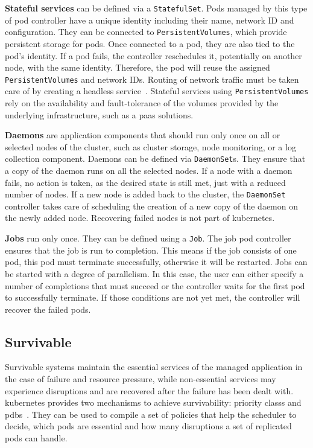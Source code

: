  \textbf{Stateful services} can be defined via a \texttt{StatefulSet}.
  Pods managed by this type of \gls{pod controller} have a unique identity including their name, network ID and configuration.
  They can be connected to \texttt{PersistentVolumes}, which provide persistent storage for pods.
  Once connected to a pod, they are also tied to the pod's identity.
  If a pod fails, the controller reschedules it, potentially on another node, with the same identity.
  Therefore, the pod will reuse the assigned \texttt{PersistentVolumes} and network IDs.
  Routing of network traffic must be taken care of by creating a headless \gls{service}~\cite{kubernetesdoc}.
  Stateful services using \texttt{PersistentVolumes} rely on the availability and fault-tolerance of the volumes provided by the underlying infrastructure, such as a \gls{paas} solutions.

  \textbf{Daemons} are application components that should run only once on all or selected nodes of the cluster, such as cluster storage, node monitoring, or a log collection component.
  Daemons can be defined via \texttt{DaemonSet}s.
  They ensure that a copy of the daemon runs on all the selected nodes.
  If a node with a daemon fails, no action is taken, as the desired state is still met, just with a reduced number of nodes.
  If a new node is added back to the cluster, the \texttt{DaemonSet} controller takes care of scheduling the creation of a new copy of the daemon on the newly added node.
  Recovering failed nodes is not part of \gls{kubernetes}.

  \textbf{Jobs} run only once.
  They can be defined using a \texttt{Job}.
  The job \gls{pod controller} ensures that the job is run to completion.
  This means if the job consists of one pod, this pod must terminate successfully, otherwise it will be restarted.
  Jobs can be started with a degree of parallelism.
  In this case, the user can either specify a number of completions that must succeed or the controller waits for the first pod to successfully terminate.
  If those conditions are not yet met, the controller will recover the failed pods.

\subsection{Survivable}\label{sec:self-healing-kubernetes:survivable}
  Survivable systems maintain the essential services of the managed application in the case of failure and resource pressure, while non-essential services may experience disruptions and are recovered after the failure has been dealt with.
  \Gls{kubernetes} provides two mechanisms to achieve survivability: \glspl{priority class} and \glspl{pdb}~\cite{kubernetesdoc}.
  They can be used to compile a set of policies that help the scheduler to decide, which pods are essential and how many disruptions a set of replicated pods can handle.


